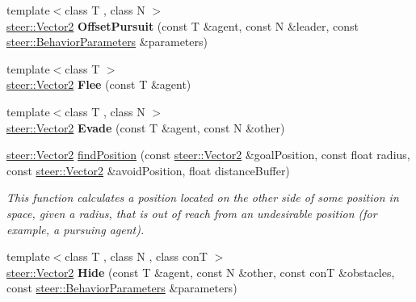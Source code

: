 \begin{DoxyCompactItemize}
\item 
\hypertarget{namespacesteer_a0d413b52056c230d68f9ed386b3ded29}{{\footnotesize template$<$class T , class N $>$ }\\\hyperlink{structsteer_1_1_vector2}{steer\-::\-Vector2} {\bfseries Offset\-Pursuit} (const T \&agent, const N \&leader, const \hyperlink{structsteer_1_1_behavior_parameters}{steer\-::\-Behavior\-Parameters} \&parameters)}\label{namespacesteer_a0d413b52056c230d68f9ed386b3ded29}

\item 
\hypertarget{namespacesteer_ac47d67a7d16499e4472eca2935cd7971}{{\footnotesize template$<$class T $>$ }\\\hyperlink{structsteer_1_1_vector2}{steer\-::\-Vector2} {\bfseries Flee} (const T \&agent)}\label{namespacesteer_ac47d67a7d16499e4472eca2935cd7971}

\item 
\hypertarget{namespacesteer_a9a02fe7c1f5fcfd39df1d1e81c000e2c}{{\footnotesize template$<$class T , class N $>$ }\\\hyperlink{structsteer_1_1_vector2}{steer\-::\-Vector2} {\bfseries Evade} (const T \&agent, const N \&other)}\label{namespacesteer_a9a02fe7c1f5fcfd39df1d1e81c000e2c}

\item 
\hyperlink{structsteer_1_1_vector2}{steer\-::\-Vector2} \hyperlink{namespacesteer_ab3c11f7ee0663f57db131206e0e0a188}{find\-Position} (const \hyperlink{structsteer_1_1_vector2}{steer\-::\-Vector2} \&goal\-Position, const float radius, const \hyperlink{structsteer_1_1_vector2}{steer\-::\-Vector2} \&avoid\-Position, float distance\-Buffer)
\begin{DoxyCompactList}\small\item\em This function calculates a position located on the other side of some position in space, given a radius, that is out of reach from an undesirable position (for example, a pursuing agent). \end{DoxyCompactList}\item 
\hypertarget{namespacesteer_a7f567ed70905af9dfc3cd099cc355e57}{{\footnotesize template$<$class T , class N , class con\-T $>$ }\\\hyperlink{structsteer_1_1_vector2}{steer\-::\-Vector2} {\bfseries Hide} (const T \&agent, const N \&other, const con\-T \&obstacles, const \hyperlink{structsteer_1_1_behavior_parameters}{steer\-::\-Behavior\-Parameters} \&parameters)}\label{namespacesteer_a7f567ed70905af9dfc3cd099cc355e57}


\end{DoxyCompactItemize}
